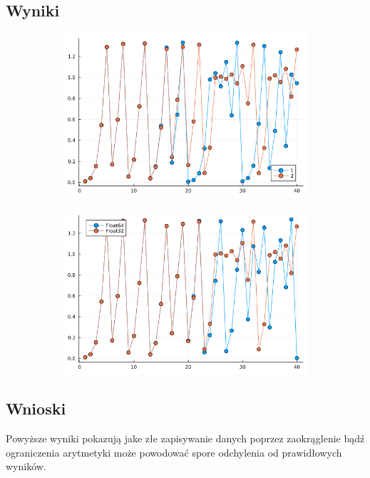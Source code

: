 \documentclass{article}
\def\v{0.47}
\begin{document}
\subsection*{Wyniki}
	\begin{figure}[H]
		\centering
		\begin{subfigure}[b]{\v\linewidth}
			\includegraphics[width=\linewidth]{graphs/5.1.png}
		\end{subfigure}
		\begin{subfigure}[b]{\v\linewidth}
			\includegraphics[width=\linewidth]{graphs/5.2.png}
		\end{subfigure}
	\end{figure}
\subsection*{Wnioski}
	Powyższe wyniki pokazują jake złe zapisywanie danych poprzez zaokrąglenie bądź ograniczenia arytmetyki może powodować spore odchylenia od prawidłowych wyników.
\end{document}
